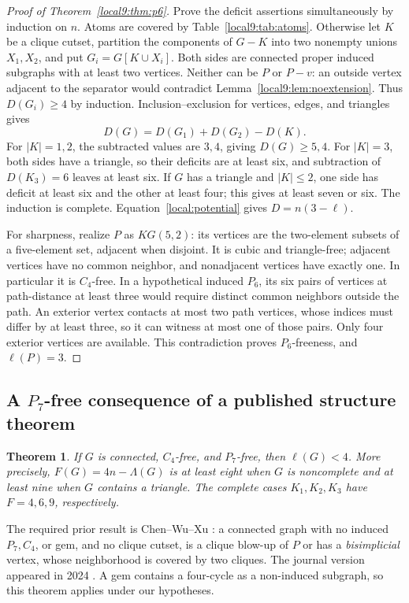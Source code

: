 \documentclass[11pt,a4paper]{article}
\newtheorem{theorem}{Theorem}[section]
\theoremstyle{definition}\newtheorem{definition}[theorem]{Definition}
\theoremstyle{remark}\newtheorem{remark}[theorem]{Remark}
\begin{document}
\begin{proof}[Proof of Theorem~\ref{local9:thm:p6}]
Prove the deficit assertions simultaneously by induction on $n$. Atoms
are covered by Table~\ref{local9:tab:atoms}. Otherwise let $K$ be a clique
cutset, partition the components of $G-K$ into two nonempty unions
$X_1,X_2$, and put $G_i=G[K\cup X_i]$. Both sides are connected proper
induced subgraphs with at least two vertices. Neither can be $P$ or $P-v$:
an outside vertex adjacent to the separator would contradict
Lemma~\ref{local9:lem:noextension}. Thus $D(G_i)\ge4$ by induction.
Inclusion--exclusion for vertices, edges, and triangles gives
\begin{equation}\label{local9:eq:glue3}
 D(G)=D(G_1)+D(G_2)-D(K).
\end{equation}
For $|K|=1,2$, the subtracted values are $3,4$, giving $D(G)\ge5,4$.
For $|K|=3$, both sides have a triangle, so their deficits are at least
six, and subtraction of $D(K_3)=6$ leaves at least six. If $G$ has a
triangle and $|K|\le2$, one side has deficit at least six and the other
at least four; this gives at least seven or six. The induction is complete.
Equation~\eqref{local:potential} gives $D=n(3-\ell)$.

For sharpness, realize $P$ as $KG(5,2)$: its vertices are the two-element
subsets of a five-element set, adjacent when disjoint. It is cubic and
triangle-free; adjacent vertices have no common neighbor, and nonadjacent
vertices have exactly one. In particular it is $C_4$-free. In a hypothetical
induced $P_6$, its six pairs of vertices at path-distance at least three
would require distinct common neighbors outside the path. An exterior
vertex contacts at most two path vertices, whose indices must differ by
at least three, so it can witness at most one of those pairs. Only four
exterior vertices are available. This contradiction proves $P_6$-freeness,
and $\ell(P)=3$.
\end{proof}



\subsection{\texorpdfstring{A $P_7$-free consequence of a published structure theorem}{A P7-free consequence of a published structure theorem}}
\begin{theorem}\label{local9:thm:p7}
If $G$ is connected, $C_4$-free, and $P_7$-free, then $\ell(G)<4$. More precisely,
$F(G)=4n-\Lambda(G)$ is at least eight when $G$ is noncomplete and at least
nine when $G$ contains a triangle. The complete cases $K_1,K_2,K_3$ have
$F=4,6,9$, respectively.
\end{theorem}
The required prior result is Chen--Wu--Xu \cite[Theorem 1.3]{src:cwxpre}:
a connected graph with no induced $P_7,C_4$, or gem, and no clique cutset,
is a clique blow-up of $P$ or has a \emph{bisimplicial} vertex, whose
neighborhood is covered by two cliques. The journal version appeared in
2024 \cite{src:cwx}. A gem contains a four-cycle as a non-induced subgraph,
so this theorem applies under our hypotheses.
\end{document}
